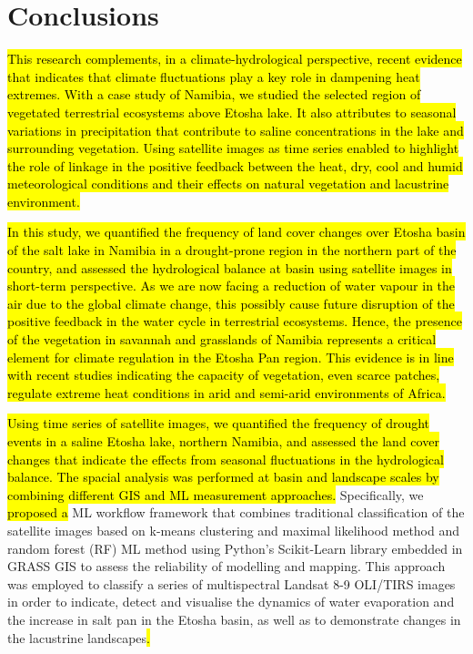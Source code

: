 \documentclass[climate,article,submit,pdftex,moreauthors]{Definitions/mdpi}
\begin{document}
\section{Conclusions}

\hl{This research complements, in a climate-hydrological perspective, recent evidence that indicates that climate fluctuations play a key role in dampening heat extremes. With a case study of Namibia, we studied the selected region of vegetated terrestrial ecosystems above Etosha lake. It also attributes to seasonal variations in precipitation that contribute to saline concentrations in the lake and surrounding vegetation. Using satellite images as time series enabled to highlight the role of linkage in the positive feedback between the heat, dry, cool and humid meteorological conditions and their effects on natural vegetation and lacustrine environment. }

\hl{In this study, we quantified the frequency of land cover changes over Etosha basin of the salt lake in Namibia in a drought-prone region in the northern part of the country, and assessed the hydrological balance at basin using satellite images in short-term perspective. As we are now facing a reduction of water vapour in the air due to the global climate change, this possibly cause future disruption of the positive feedback in the water cycle in terrestrial ecosystems. Hence, the presence of the vegetation in savannah and grasslands of Namibia represents a critical element for climate regulation in the Etosha Pan region. This evidence is in line with recent studies indicating the capacity of vegetation, even scarce patches, regulate extreme heat conditions in arid and semi-arid environments of Africa.} 

\hl{Using time series of satellite images, we quantified the frequency of drought events in a saline Etosha lake, northern Namibia, and assessed the land cover changes that indicate the effects from seasonal fluctuations in the hydrological balance. The spacial analysis was performed at basin and landscape scales by combining different GIS and ML measurement approaches.} Specifically, we\hl{ proposed a }ML workflow framework that combines traditional classification of the satellite images based on k-means clustering and maximal likelihood method and random forest (RF) ML method using Python's Scikit-Learn library embedded in GRASS GIS to assess the reliability of modelling and mapping. This approach was employed to classify a series of multispectral Landsat 8-9 OLI/TIRS images in order to indicate, detect and visualise the dynamics of water evaporation and the increase in salt pan in the Etosha basin, as well as to demonstrate changes in the lacustrine landscapes\hl{.} 
\end{document}
